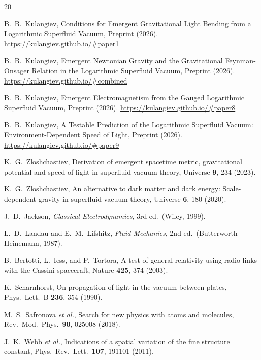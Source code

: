 \documentclass[12pt, a4paper]{article}
\begin{document}
\begin{thebibliography}{20}

B.~B.~Kulangiev,
Conditions for Emergent Gravitational Light Bending from a Logarithmic Superfluid Vacuum,
Preprint (2026).
\url{https://kulangiev.github.io/#paper1}

B.~B.~Kulangiev,
Emergent Newtonian Gravity and the Gravitational Feynman-Onsager Relation in the Logarithmic Superfluid Vacuum,
Preprint (2026).
\url{https://kulangiev.github.io/#combined}

B.~B.~Kulangiev,
Emergent Electromagnetism from the Gauged Logarithmic Superfluid Vacuum,
Preprint (2026).
\url{https://kulangiev.github.io/#paper8}

B.~B.~Kulangiev,
A Testable Prediction of the Logarithmic Superfluid Vacuum: Environment-Dependent Speed of Light,
Preprint (2026).
\url{https://kulangiev.github.io/#paper9}

K.~G.~Zloshchastiev,
Derivation of emergent spacetime metric, gravitational
potential and speed of light in superfluid vacuum
theory,
Universe \textbf{9}, 234 (2023).

K.~G.~Zloshchastiev,
An alternative to dark matter and dark energy:
Scale-dependent gravity in superfluid vacuum theory,
Universe \textbf{6}, 180 (2020).

J.~D.~Jackson,
\emph{Classical Electrodynamics}, 3rd ed.\
(Wiley, 1999).

L.~D.~Landau and E.~M.~Lifshitz,
\emph{Fluid Mechanics}, 2nd ed.\
(Butterworth-Heinemann, 1987).

B.~Bertotti, L.~Iess, and P.~Tortora,
A test of general relativity using radio links with
the Cassini spacecraft,
Nature \textbf{425}, 374 (2003).

K.~Scharnhorst,
On propagation of light in the vacuum between plates,
Phys.\ Lett.\ B \textbf{236}, 354 (1990).

M.~S.~Safronova \emph{et al.},
Search for new physics with atoms and molecules,
Rev.\ Mod.\ Phys.\ \textbf{90}, 025008 (2018).

J.~K.~Webb \emph{et al.},
Indications of a spatial variation of the fine
structure constant,
Phys.\ Rev.\ Lett.\ \textbf{107}, 191101 (2011).

\end{thebibliography}
\end{document}
